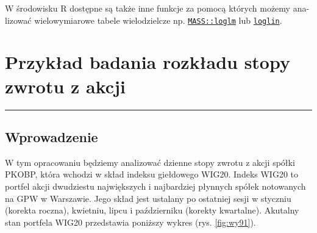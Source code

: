 \documentclass[polish,]{book}
\begin{document}
W środowisku R dostępne są także inne funkcje za pomocą których możemy ana-
lizować wielowymiarowe tabele wielodzielcze np. \href{https://rdrr.io/cran/MASS/man/loglm.html}{\texttt{MASS::loglm}} lub \href{https://rdrr.io/r/stats/loglin.html}{\texttt{loglin}}.

\hypertarget{part_9}{%
\chapter{Przykład badania rozkładu stopy zwrotu z akcji}\label{part_9}}

\begin{center}\rule{0.5\linewidth}{\linethickness}\end{center}

\hypertarget{part_9.1}{%
\section{Wprowadzenie}\label{part_9.1}}

W tym opracowaniu będziemy analizować dzienne stopy zwrotu z akcji spółki PKOBP,
która wchodzi w skład indeksu giełdowego WIG20. Indeks WIG20 to portfel akcji
dwudziestu największych i najbardziej płynnych spółek notowanych na GPW w
Warszawie. Jego skład jest ustalany po ostatniej sesji w styczniu (korekta roczna),
kwietniu, lipcu i październiku (korekty kwartalne). Akutalny stan portfela WIG20
przedstawia poniższy wykres (rys. \ref{fig:wy91}).
\end{document}

